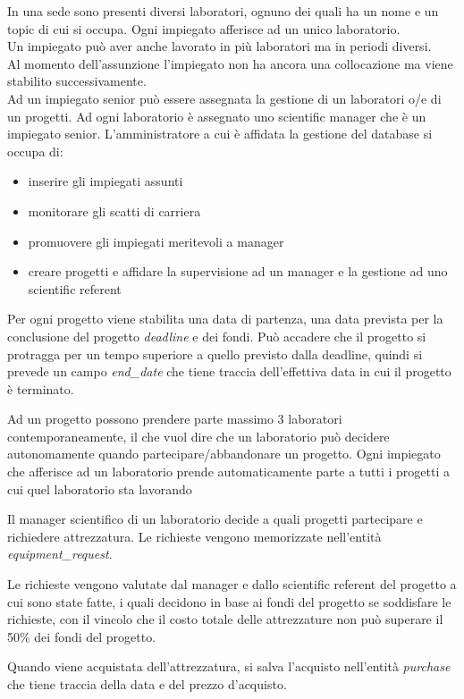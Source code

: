 In una sede sono presenti diversi laboratori, ognuno dei quali ha un nome e un topic di cui si occupa.\sskip
Ogni impiegato afferisce ad un unico laboratorio.\\
Un impiegato può aver anche lavorato in più laboratori ma in periodi diversi.\\
Al momento dell'assunzione l'impiegato non ha ancora una collocazione ma viene stabilito successivamente.\\
Ad un impiegato senior può essere assegnata la gestione di un laboratori o/e di un progetti.\sskip
Ad ogni laboratorio è assegnato uno scientific manager che è un impiegato senior.\sskip
L'amministratore a cui è affidata la gestione del database si occupa di:
\begin{itemize}
	\item inserire gli impiegati assunti
	\item monitorare gli scatti di carriera
	\item promuovere gli impiegati meritevoli a manager
	\item creare progetti e affidare la supervisione ad un manager e la gestione ad uno scientific referent
\end{itemize}
Per ogni progetto viene stabilita una data di partenza, una data prevista per la conclusione del progetto \textit{deadline} e dei fondi.
Può accadere che il progetto si protragga per un tempo superiore a quello previsto dalla deadline, quindi si prevede un campo \textit{end\_date} che tiene traccia dell'effettiva data in cui il progetto è terminato.

Ad un progetto possono prendere parte massimo 3 laboratori contemporaneamente, il che vuol dire che un laboratorio può decidere autonomamente quando partecipare/abbandonare un progetto.
Ogni impiegato che afferisce ad un laboratorio prende automaticamente parte a tutti i progetti a cui quel laboratorio sta lavorando

Il manager scientifico di un laboratorio decide a quali progetti partecipare e richiedere attrezzatura. Le richieste vengono memorizzate nell'entità \textit{equipment\_request}.

Le richieste vengono valutate dal manager e dallo scientific referent del progetto a cui sono state fatte, i quali decidono in base ai fondi del progetto se soddisfare le richieste, con il vincolo che il costo totale delle attrezzature non può superare il 50\% dei fondi del progetto.

Quando viene acquistata dell'attrezzatura, si salva l'acquisto nell'entità \textit{purchase} che tiene traccia della data e del prezzo d'acquisto.

